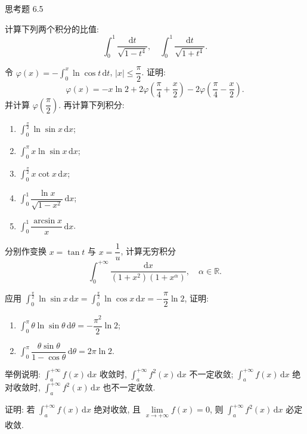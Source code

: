\begin{exblock}{思考题 6.5}

  \item 计算下列两个积分的比值:
  \[
  \int_{0}^{1}\frac{\mathrm{d}t}{\sqrt{1-t^{4}}},\quad\int_{0}^{1}\frac{\mathrm{d}t}{\sqrt{1+t^{4}}}.
\]

  \item 令 $\varphi(x)=-\int_{0}^{x}\ln\cos t\,\mathrm{d}t$, $|x|\leqslant\dfrac{\pi}{2}$. 证明:
  \[
  \varphi(x)=-x\ln2+2\varphi\left(\frac{\pi}{4}+\frac{x}{2}\right)-2\varphi\left(\frac{\pi}{4}-\frac{x}{2}\right).
\]
  并计算 $\varphi\left(\dfrac{\pi}{2}\right)$. 再计算下列积分:
  \begin{enumerate}[label=(\arabic*)]
    \item $\int_{0}^{\frac{\pi}{2}}\ln\sin x\,\mathrm{d}x$;
    \item $\int_{0}^{\pi}x\ln\sin x\,\mathrm{d}x$;
    \item $\int_{0}^{\frac{\pi}{2}}x\cot x\,\mathrm{d}x$;
    \item $\int_{0}^{1}\dfrac{\ln x}{\sqrt{1-x^{2}}}\,\mathrm{d}x$;
    \item $\int_{0}^{1}\dfrac{\arcsin x}{x}\,\mathrm{d}x$.
  \end{enumerate}

  \item 分别作变换 $x=\tan t$ 与 $x=\dfrac{1}{u}$, 计算无穷积分
  \[
  \int_{0}^{+\infty}\frac{\mathrm{d}x}{(1+x^{2})(1+x^{\alpha})},\quad\alpha\in\mathbb{R}.
\]

  \item 应用 $\int_{0}^{\frac{\pi}{2}}\ln\sin x\,\mathrm{d}x=\int_{0}^{\frac{\pi}{2}}\ln\cos x\,\mathrm{d}x=-\dfrac{\pi}{2}\ln2$, 证明:
  \begin{enumerate}[label=(\arabic*)]
    \item $\int_{0}^{\pi}\theta\ln\sin\theta\,\mathrm{d}\theta=-\dfrac{\pi^{2}}{2}\ln2$;
    \item $\int_{0}^{\pi}\dfrac{\theta\sin\theta}{1-\cos\theta}\,\mathrm{d}\theta=2\pi\ln2$.
  \end{enumerate}

  \item 举例说明: $\int_{a}^{+\infty}f(x)\,\mathrm{d}x$ 收敛时, $\int_{a}^{+\infty}f^{2}(x)\,\mathrm{d}x$ 不一定收敛; $\int_{a}^{+\infty}f(x)\,\mathrm{d}x$ 绝对收敛时, $\int_{a}^{+\infty}f^{2}(x)\,\mathrm{d}x$ 也不一定收敛.

  \item 证明: 若 $\int_{a}^{+\infty}f(x)\,\mathrm{d}x$ 绝对收敛, 且 $\lim\limits_{x\to+\infty}f(x)=0$, 则 $\int_{a}^{+\infty}f^{2}(x)\,\mathrm{d}x$ 必定收敛.


\end{exblock}
